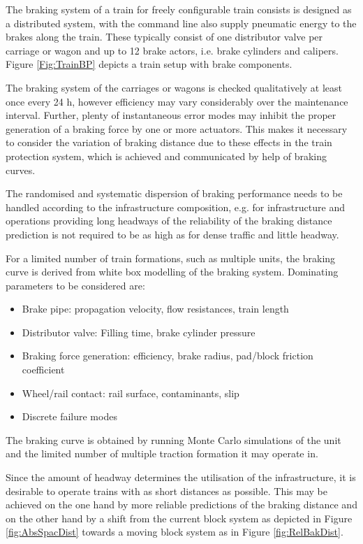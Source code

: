 \documentclass[a4paper, 12pt]{scrartcl}
\begin{document}
The braking system of a train for freely configurable train consists is designed as a distributed system, with the command line also supply pneumatic energy to the brakes along the train. These typically consist of one distributor valve per carriage or wagon and up to 12 brake actors, i.e. brake cylinders and calipers. Figure \ref{Fig:TrainBP} depicts a train setup with brake components.

The braking system of the carriages or wagons is checked qualitatively at least once every 24 h, however efficiency may vary considerably over the maintenance interval. Further, plenty of instantaneous error modes may inhibit the proper generation of a braking force by one or more actuators. This makes it necessary to consider the variation of braking distance due to these effects in the train protection system, which is achieved and communicated by help of braking curves. 

The randomised and systematic dispersion of braking performance needs to be handled according to the infrastructure composition, e.g. for infrastructure and operations providing long headways of the reliability of the braking distance prediction is not required to be as high as for dense traffic and little headway.

For a limited number of train formations, such as multiple units, the braking curve is derived from white box modelling of the braking system. Dominating parameters to be considered are:
\begin{itemize}
	\item Brake pipe: propagation velocity, flow resistances, train length
	\item Distributor valve: Filling time, brake cylinder pressure
	\item Braking force generation: efficiency, brake radius, pad/block friction coefficient
	\item Wheel/rail contact: rail surface, contaminants, slip
 	\item Discrete failure modes \cite{tsilocpas}
\end{itemize} 
The braking curve is obtained by running Monte Carlo simulations of the unit and the limited number of multiple traction formation it may operate in.

Since the amount of headway determines the utilisation of the infrastructure, it is desirable to operate trains with as short distances as possible. This may be achieved on the one hand by more reliable predictions of the braking distance and on the other hand by a shift from the current block system as depicted in Figure \ref{fig:AbsSpacDist} towards a moving block system as in Figure \ref{fig:RelBakDist}.
\end{document}
